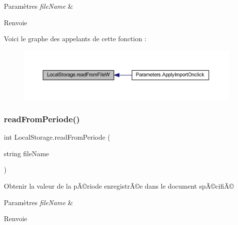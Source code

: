 \begin{DoxyParams}{Paramètres}
{\em file\+Name} & \\
\hline
\end{DoxyParams}
\begin{DoxyReturn}{Renvoie}

\end{DoxyReturn}
Voici le graphe des appelants de cette fonction \+:\nopagebreak
\begin{figure}[H]
\begin{center}
\leavevmode
\includegraphics[width=350pt]{class_local_storage_aef684ee38f8d4dccf157503ec6d04a7a_icgraph}
\end{center}
\end{figure}
\mbox{\label{class_local_storage_a8e862054e8b3f3c33dd64ed44d5983c4}} 
\subsubsection{\texorpdfstring{read\+From\+Periode()}{readFromPeriode()}}
{\footnotesize\ttfamily int Local\+Storage.\+read\+From\+Periode (\begin{DoxyParamCaption}\item[{string}]{file\+Name }\end{DoxyParamCaption})\hspace{0.3cm}{\ttfamily [inline]}}



Obtenir la valeur de la pÃ©riode enregistrÃ©e dans le document spÃ©cifiÃ© 


\begin{DoxyParams}{Paramètres}
{\em file\+Name} & \\
\hline
\end{DoxyParams}
\begin{DoxyReturn}{Renvoie}

\end{DoxyReturn}
\mbox{\label{class_local_storage_afbd7328c28fa47b11fcc174da3cc8ec1}} 
